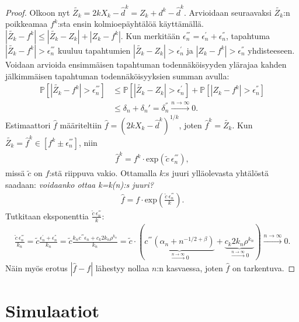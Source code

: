 \documentclass[finnish,12pt,a4paper,pdftex,sci,utf8]{aaltothesis}
\begin{document}
\begin{proof}
Olkoon nyt $\tilde{Z_k} = 2kX_k - \hat{d}^k = Z_k + d^k - \hat{d}^k$. Arvioidaan seuraavaksi $\tilde{Z_k}$:n poikkeamaa $f^k$:sta ensin kolmioepäyhtälöä käyttämällä. $|\tilde{Z_k} - f^k| \leq |\tilde{Z_k} - Z_k| + |Z_k - f^k|$. Kun merkitään $\epsilon_{n}^{'''} = \epsilon_{n}^{'} + \epsilon_{n}^{''}$, tapahtuma $|\tilde{Z_k} - f^k| > \epsilon_{n}^{'''}$ kuuluu tapahtumien $|\tilde{Z_k} - Z_k| > \epsilon_{n}^{'}$ ja $|Z_k - f^k| > \epsilon_{n}^{''}$ yhdisteeseen. Voidaan arvioida ensimmäisen tapahtuman todennäköisyyden ylärajaa kahden jälkimmäisen tapahtuman todennäköisyyksien summan avulla:
\begin{align*}
	\mathbb{P}[|\tilde{Z_k} - f^k| > \epsilon_{n}^{'''}] &\leq \mathbb{P}[|\tilde{Z_k} - Z_k| > \epsilon_{n}^{'}] + \mathbb{P}[|Z_k - f^k| > \epsilon_{n}^{''}] \\
	&\leq \delta_n + \delta_n' = \delta_n^{''} \xrightarrow{n \rightarrow \infty} 0.
\end{align*}
Estimaattori $\hat{f}$ määriteltiin $\hat{f} = (2kX_k - \hat{d}^k)^{1/k}$, joten $\hat{f}^k = \tilde{Z_k}$. Kun $\tilde{Z_k} = \hat{f}^k \in [f^k \pm \epsilon_{n}^{'''}]$, niin 
\begin{align*}
	\hat{f}^k = f^k \cdot \text{exp}(\tilde{c} \ \epsilon_{n}^{'''}),
\end{align*}
missä $\tilde{c}$ on $f$:stä riippuva vakio. Ottamalla $k$:s juuri ylläolevasta yhtälöstä saadaan: \textit{voidaanko ottaa k=k(n):s juuri?}
\begin{align*}
	\hat{f} = f \cdot \text{exp}(\frac{\tilde{c} \ \epsilon_{n}^{'''}}{k}).
\end{align*}
Tutkitaan eksponenttia $\frac{\tilde{c} \ \epsilon_{n}^{'''}}{k}$:
\begin{align*}
	\frac{\tilde{c} \ \epsilon_{n}^{'''}}{k_n} = \tilde{c} \frac{\epsilon_{n}^{'} + \epsilon_{n}^{''}}{k_n} = \tilde{c} \frac{k_n c^{'''} \epsilon_{n}^{} + c_k 2k_n \rho^{k_n}}{k_n} = \tilde{c} \cdot (\underbrace{c^{'''} (\alpha_n + n^{-1/2 + \beta})}_{\xrightarrow{n \rightarrow \infty} 0} + \underbrace{c_k 2k_n \rho^{k_n}}_{\xrightarrow{n \rightarrow \infty} 0}) \xrightarrow{n \rightarrow \infty} 0.
\end{align*}
Näin myös erotus $|\hat{f} - f| $ lähestyy nollaa $n$:n kasvaessa, joten $\hat{f}$ on tarkentuva.
\end{proof}
\clearpage
\section{Simulaatiot}
\end{document}
